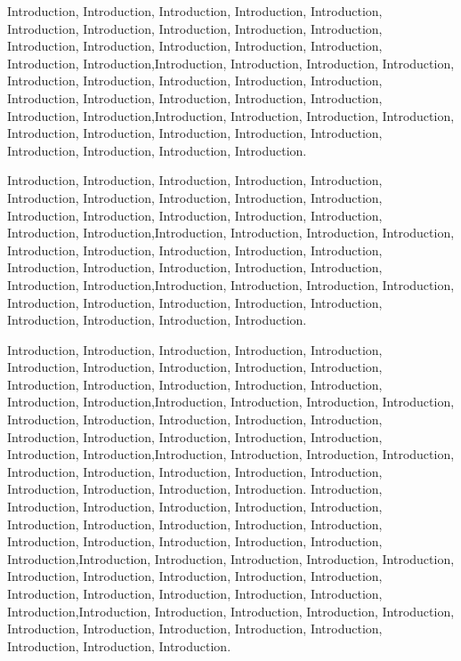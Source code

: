 Introduction, Introduction, Introduction, Introduction, Introduction, Introduction, Introduction, Introduction, Introduction, Introduction, Introduction, Introduction, Introduction, Introduction, Introduction, Introduction, Introduction,Introduction, Introduction, Introduction, Introduction, Introduction, Introduction, Introduction, Introduction, Introduction, Introduction, Introduction, Introduction, Introduction, Introduction, Introduction, Introduction,Introduction, Introduction, Introduction, Introduction, Introduction, Introduction, Introduction, Introduction, Introduction, Introduction, Introduction, Introduction, Introduction.

Introduction, Introduction, Introduction, Introduction, Introduction, Introduction, Introduction, Introduction, Introduction, Introduction, Introduction, Introduction, Introduction, Introduction, Introduction, Introduction, Introduction,Introduction, Introduction, Introduction, Introduction, Introduction, Introduction, Introduction, Introduction, Introduction, Introduction, Introduction, Introduction, Introduction, Introduction, Introduction, Introduction,Introduction, Introduction, Introduction, Introduction, Introduction, Introduction, Introduction, Introduction, Introduction, Introduction, Introduction, Introduction, Introduction.

Introduction, Introduction, Introduction, Introduction, Introduction, Introduction, Introduction, Introduction, Introduction, Introduction, Introduction, Introduction, Introduction, Introduction, Introduction, Introduction, Introduction,Introduction, Introduction, Introduction, Introduction, Introduction, Introduction, Introduction, Introduction, Introduction, Introduction, Introduction, Introduction, Introduction, Introduction, Introduction, Introduction,Introduction, Introduction, Introduction, Introduction, Introduction, Introduction, Introduction, Introduction, Introduction, Introduction, Introduction, Introduction, Introduction.
Introduction, Introduction, Introduction, Introduction, Introduction, Introduction, Introduction, Introduction, Introduction, Introduction, Introduction, Introduction, Introduction, Introduction, Introduction, Introduction, Introduction,Introduction, Introduction, Introduction, Introduction, Introduction, Introduction, Introduction, Introduction, Introduction, Introduction, Introduction, Introduction, Introduction, Introduction, Introduction, Introduction,Introduction, Introduction, Introduction, Introduction, Introduction, Introduction, Introduction, Introduction, Introduction, Introduction, Introduction, Introduction, Introduction.

